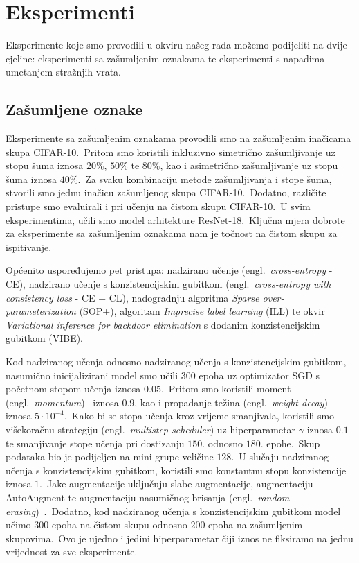 \documentclass[diplomskirad]{fer}
\begin{document}
\chapter{Eksperimenti}
\label{pog:eksperimenti}

Eksperimente koje smo provodili u okviru našeg rada možemo podijeliti na dvije cjeline: eksperimenti sa zašumljenim oznakama te eksperimenti s napadima umetanjem stražnjih vrata.\ 

\section{Zašumljene oznake}
\label{sek:eksp_zasumljene}

Eksperimente sa zašumljenim oznakama provodili smo na zašumljenim inačicama skupa CIFAR-10.\ 
Pritom smo koristili inkluzivno simetrično zašumljivanje uz stopu šuma iznosa $20\%$, $50\%$ te $80\%$, kao i asimetrično zašumljivanje uz stopu šuma iznosa $40\%$.\ 
Za svaku kombinaciju metode zašumljivanja i stope šuma, stvorili smo jednu inačicu zašumljenog skupa CIFAR-10.\ Dodatno, različite pristupe smo evaluirali i pri učenju na čistom skupu CIFAR-10.\ 
U svim eksperimentima, učili smo model arhitekture ResNet-18.\ Ključna mjera dobrote za eksperimente sa zašumljenim oznakama nam je točnost na čistom skupu za ispitivanje.\

Općenito uspoređujemo pet pristupa: nadzirano učenje (engl.\ \textit{cross-entropy} - CE), nadzirano učenje s konzistencijskim gubitkom (engl.\ \textit{cross-entropy with consistency loss} - CE + CL), nadogradnju algoritma \textit{Sparse over-parameterization} (SOP+), algoritam \textit{Imprecise label learning} (ILL) te okvir \textit{Variational inference for backdoor elimination} s dodanim konzistencijskim gubitkom (VIBE).\ 

Kod nadziranog učenja odnosno nadziranog učenja s konzistencijskim gubitkom, nasumično inicijalizirani model smo učili $300$ epoha uz optimizator SGD s početnom stopom učenja iznosa $0.05$.\ 
Pritom smo koristili moment (engl.\ \textit{momentum})~\cite{sutskever2013importance} iznosa $0.9$, kao i propadanje težina (engl.\ \textit{weight decay})~\cite{krogh1991simple} iznosa $5 \cdot 10^{-4}$.\ 
Kako bi se stopa učenja kroz vrijeme smanjivala, koristili smo višekoračnu strategiju (engl.\ \textit{multistep scheduler}) uz hiperparametar $\gamma$ iznosa $0.1$ te smanjivanje stope učenja pri dostizanju $150.$ odnosno $180.$ epohe.\ 
Skup podataka bio je podijeljen na mini-grupe veličine $128$.\ U slučaju nadziranog učenja s konzistencijskim gubitkom, koristili smo konstantnu stopu konzistencije iznosa $1$.\ 
Jake augmentacije uključuju slabe augmentacije, augmentaciju AutoAugment te augmentaciju nasumičnog brisanja (engl.\ \textit{random erasing})~\cite{zhong2020random}.\ 
Dodatno, kod nadziranog učenja s konzistencijskim gubitkom model učimo $300$ epoha na čistom skupu odnosno $200$ epoha na zašumljenim skupovima.\ Ovo je ujedno i jedini hiperparametar čiji iznos ne fiksiramo na jednu vrijednost za sve eksperimente.\ 
\end{document}

